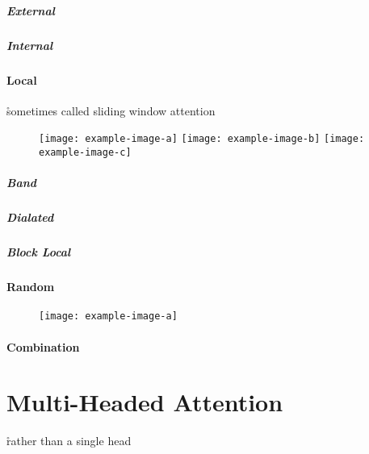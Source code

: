 
\paragraph{External}

\paragraph{Internal}


\subsubsection{Local}

\r{sometimes called sliding window attention}

\begin{figure}[htp]
	\centering
	\texttt{[image: example-image-a]}\hfil
	\texttt{[image: example-image-b]}\hfil
	\texttt{[image: example-image-c]}\hfil
	\caption{}
	\label{fig:attn_diagonal}
\end{figure}

\paragraph{Band}

\paragraph{Dialated}

\paragraph{Block Local}

\subsubsection{Random}

\begin{figure}[htp]
	\centering
	\texttt{[image: example-image-a]}\hfil
	\caption{}
	\label{fig:attn_random}
\end{figure}

\subsubsection{Combination}




\chapter{Multi-Headed Attention}

\r{rather than a single head}



